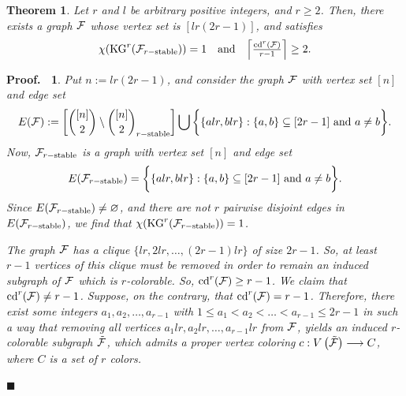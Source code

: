 \documentclass[11pt]{article}
\newtheorem{preproof}{{\bf Proof.\ }}
\newenvironment{proof}[1]{\begin{preproof}{\rm
               #1}\hfill{$\blacksquare$}}{\end{preproof}}
\newtheorem{prethm}{{\bf Theorem}}
\newenvironment{thm}{\begin{prethm}{\hspace{-0.5
               em}{\bf.\ }}}{\end{prethm}}
\begin{document}
    

\begin{thm}
	Let $r$ and $l$ be arbitrary positive integers, and $r\geq 2$.
	Then, there exists a graph ${\cal F}$ whose vertex set is $[lr(2r-1)]$, and satisfies
	$$\begin{array}[1]{ccc}
		\chi ({\rm KG}^r ({\cal F}_{r-{\rm stable}}))=1  &  {\rm and}   &
		\left\lceil  \frac{{\rm cd}^r ({\cal F})}{r-1}   \right\rceil  \geq 2.
	\end{array}  $$
\end{thm}

\begin{proof}{
	Put $n:=lr(2r-1)$, and consider the graph ${\cal F}$ with vertex set $[n]$
	and edge set
	$$E({\cal F}):= \bigg[   {[n] \choose 2}  \setminus {[n] \choose 2}_{r- {\rm stable} } \bigg] \bigcup \bigg\{  \{alr, blr\} : \{a,b\} \subseteq [2r-1] \ {\rm and} \ a \neq b   \bigg\}.$$
	Now,  ${\cal F}_{r-{\rm stable}}$ is a graph with vertex set $[n]$
	and edge set
	$$E({\cal F}_{r-{\rm stable}})= \bigg\{  \{alr, blr\} : \{a,b\} \subseteq [2r-1] \ {\rm and} \ a \neq b   \bigg\}.$$
	Since $E({\cal F}_{r-{\rm stable}}) \neq \varnothing$, and there are not $r$ pairwise disjoint edges in $E({\cal F}_{r-{\rm stable}})$, we find that
	$\chi ({\rm KG}^r ({\cal F}_{r-{\rm stable}}))=1$.
	
	\noindent The graph ${\cal F}$ has a clique $\{lr, 2lr, \dots , (2r-1)lr\}$ of size $2r-1$. So,
	at least $r-1$ vertices of this clique must be removed in order to remain an induced subgraph of
	${\cal F}$ which is $r$-colorable.
	So, ${\rm cd}^r ({\cal F}) \geq r-1$.
	We claim that ${\rm cd}^r ({\cal F}) \neq r-1$.
	Suppose, on the contrary, that ${\rm cd}^r ({\cal F}) = r-1$.
	Therefore, there exist some integers $a_{1} , a_{2} , \dots , a_{r-1}$
	with $1 \leq a_{1} < a_{2} < \dots < a_{r-1} \leq 2r-1$ in such a way that
	removing all vertices $a_{1}lr , a_{2}lr , \dots , a_{r-1}lr$
	from ${\cal F}$, yields an induced $r$-colorable subgraph $\tilde{{\cal F}}$, which
	admits a proper vertex coloring $c:V \left( \tilde{{\cal F}} \right) \longrightarrow C$,
	where $C$ is a set of $r$ colors.
	
}
\end{proof}
\end{document}
